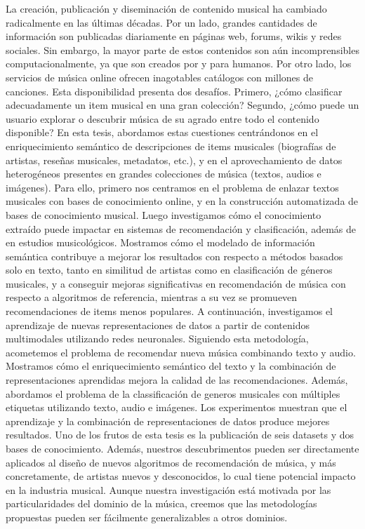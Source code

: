 La creación, publicación y diseminación de contenido musical ha cambiado radicalmente en las últimas décadas. Por un lado, grandes cantidades de información son publicadas diariamente en páginas web, forums, wikis y redes sociales. Sin embargo, la mayor parte de estos contenidos son aún incomprensibles computacionalmente, ya que son creados por y para humanos. Por otro lado, los servicios de música online ofrecen inagotables catálogos con millones de canciones. Esta disponibilidad presenta dos desafíos. Primero, ¿cómo clasificar adecuadamente un item musical en una gran colección? Segundo, ¿cómo puede un usuario explorar o descubrir música de su agrado entre todo el contenido disponible? En esta tesis, abordamos estas cuestiones centrándonos en el enriquecimiento semántico de descripciones de items musicales (biografías de artistas, reseñas musicales, metadatos, etc.), y en el aprovechamiento de datos heterogéneos presentes en grandes colecciones de música (textos, audios e imágenes). Para ello, primero nos centramos en el problema de enlazar textos musicales con bases de conocimiento online, y en la construcción automatizada de bases de conocimiento musical. Luego investigamos cómo el conocimiento extraído puede impactar en sistemas de recomendación y clasificación, además de en estudios musicológicos. Mostramos cómo el modelado de información semántica contribuye a mejorar los resultados con respecto a métodos basados solo en texto, tanto en similitud de artistas como en clasificación de géneros musicales, y a conseguir mejoras significativas en recomendación de música con respecto a algoritmos de referencia, mientras a su vez se promueven recomendaciones de items menos populares. A continuación, investigamos el aprendizaje de nuevas representaciones de datos a partir de contenidos multimodales utilizando redes neuronales. Siguiendo esta metodología, acometemos el problema de recomendar nueva música combinando texto y audio. Mostramos cómo el enriquecimiento semántico del texto y la combinación de representaciones aprendidas mejora la calidad de las recomendaciones. Además, abordamos el problema de la classificación de generos musicales con múltiples etiquetas utilizando texto, audio e imágenes. Los experimentos muestran que el aprendizaje y la combinación de representaciones de datos produce mejores resultados. Uno de los frutos de esta tesis es la publicación de seis datasets y dos bases de conocimiento. Además, nuestros descubrimentos pueden ser directamente aplicados al diseño de nuevos algoritmos de recomendación de música, y más concretamente, de artistas nuevos y desconocidos, lo cual tiene potencial impacto en la industria musical. Aunque nuestra investigación está motivada por las particularidades del dominio de la música, creemos que las metodologías propuestas pueden ser fácilmente generalizables a otros dominios.